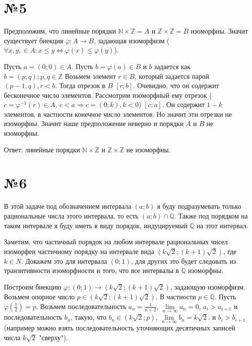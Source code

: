 \documentclass[12pt]{article}
\newcommand*{\limtoinf}[1]{\ensuremath{\lim\limits_{#1\to\infty}}}
\begin{document}
	\section*{№5}
	
	Предположим, что линейные порядки $\mathbb{N} \times \mathbb{Z} = A$ и $\mathbb{Z} \times \mathbb{Z} = B$ изоморфны.
	Значит существует биекция $\varphi: A \rightarrow B$, задающая изоморфизм
	($\forall x, y, \in A: x \leqslant y \Leftrightarrow \varphi(x) \leqslant \varphi(y)$).
	
	Пусть $a = (0; 0) \in A$. Пусть $b = \varphi(a) \in B$ и $b$ задается как $b = (p; q); p, q \in \mathbb{Z}$
	Возьмем элемент $r \in B$, который задается парой $(p - 1, q), r < b$. Тогда отрезок в $B$ $[r; b]$.
	Очевидно, что он содержит бесконечное число элементов. 
	Рассмотрим изоморфный ему отрезок ($c = \varphi^{-1}(r) \in A$, $c < a \Rightarrow c = (0; k), k < 0$)
	$[c; a]$. Он содержит $1 - k$ элементов, в частности конечное число элементов. Но значит эти отрезки не изоморфны. Значит наше предположение неверно и порядки $A$ и $B$ не изоморфны.
	
	Ответ: линейные порядки $\mathbb{N} \times \mathbb{Z}$ и $\mathbb{Z} \times \mathbb{Z}$ не изоморфны.
	
	
	
	\section*{№6}
	В этой задаче под обозначением интервала $(a; b)$ я буду подразумевать только рациональные числа этого интервала, то есть $(a; b) \cap \mathbb{Q}$. Также под порядком на таком интервале я буду иметь в виду порядок, индуцируемый $\mathbb{Q}$ на этот интервал.
	
	Заметим, что частичный порядок на любом интервале рациональных чисел изоморфен частичному порядку на интервале вида $(k\sqrt{2}; (k + 1)\sqrt{2})$, где $k \in N$. Докажем это для интервала $(0; 1)$, для других это будет следовать из транзитивности изоморфности и того, что все интервалы в $\mathbb{Q}$ изоморфны.
	
	Построим биекцию $\varphi: (0; 1) \rightarrow (k\sqrt{2}; (k + 1)\sqrt{2})$, задающую изоморфизм.	
	Возьмем опорное число $p \in (k\sqrt{2}; (k + 1)\sqrt{2})$. В частности $p \in \mathbb{Q}.$	
	Пусть $\varphi(\frac{1}{2})=p$. Возьмем последовательность $a_n=\frac{1}{n + 2}$, $\limtoinf{n}a_n = 0$, $a_i > a_{i + 1}$ и последовательность $b_n$, такую, что $b_n \in (k\sqrt{2}; p)$, $\limtoinf{n}b_n = k\sqrt{2}.$ и $b_i > b_{i + 1}$ (например можно взять последовательность уточняющих десятичных записей числа $k\sqrt{2}$ "сверху").
	
\end{document}
